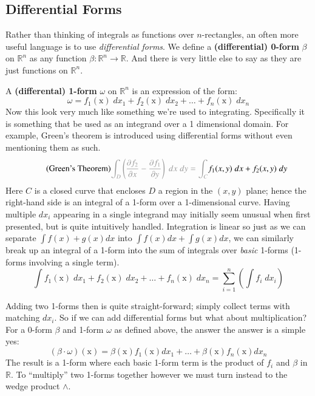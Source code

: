 
\subsection{Differential Forms}

Rather than thinking of integrals as functions over $n$-rectangles, an often more useful language is to use 
\emph{differential forms}.
We define a \textbf{(differential) 0-form} $\beta$ on $\mathbb{R}^n$ as any function 
$\beta : \mathbb{R}^n \to \mathbb{R}$.
And there is very little else to say as they are just functions on $\mathbb{R}^n$.



A \textbf{(differental) 1-form} $\omega$ on $\mathbb{R}^n$ is an expression of the form:
\begin{equation}
	\omega = f_1(\text{x}) \; dx_1 + f_2(\text{x}) \; dx_2 + \ldots + f_n(\text{x}) \; dx_n
\end{equation}
Now this look very much like something we're used to integrating.
Specifically it is something that be used as an integrand over a 1 dimensional domain.
For example, Green's theorem is introduced using differential forms without even mentioning them as such.
\begin{equation}
	\tag{Green's Theorem}
	\textcolor{black!40}{
		\int_D \left( \frac{\partial f_2}{\partial x} - \frac{\partial f_1}{\partial y}  \right) \;dx\;dy 
		=\int_{C}
	} f_1(x,y) \; dx + f_2(x,y) \; dy
\end{equation}
Here $C$ is a closed curve that encloses $D$ a region in the $(x,y)$ plane; hence the right-hand side is an integral of
a 1-form over a 1-dimensional curve.
Having multiple $dx_i$ appearing in a single integrand may initially seem unusual when first presented, 
but is quite intuitively handled.
Integration is linear so just as we can separate $\int f(x) + g(x) dx$ into $\int f(x) dx + \int g(x) dx$, we can similarly break
up an integral of a 1-form into the sum of integrals over \emph{basic} 1-forms (1-forms involving a single term).
\begin{equation}
	\int f_1(\text{x}) \; dx_1 + f_2(\text{x}) \; dx_2 + \ldots + f_n(\text{x}) \; dx_n
	=
	\sum_{i=1}^n \left( \int f_i \; dx_i \right)
\end{equation}


Adding two 1-forms then is quite straight-forward; simply collect terms with matching $dx_i$.
So if we can add differential forms but what about multiplication?
For a 0-form $\beta$ and 1-form $\omega$ as defined above, the answer the answer is a simple yes:
\begin{equation}
	(\beta \cdot \omega)(\text{x}) = \beta(\text{x})f_1(\text{x})dx_1 + \ldots  + \beta(\text{x})f_n(\text{x})dx_n
\end{equation}
The result is a 1-form where each basic 1-form term is the product of $f_i$ and $\beta$ in $\mathbb{R}$.
To ``multiply'' two 1-forms together however we must turn instead to the wedge product $\wedge$.

